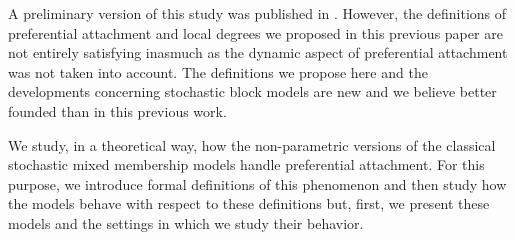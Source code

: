 
A preliminary version of this study was published in \cite{dulac-dsaa}. However, the definitions of preferential attachment and local degrees we proposed in this previous paper are not entirely satisfying inasmuch as the dynamic aspect of preferential attachment was not taken into account. The definitions we propose here and the developments concerning stochastic block models are new and we believe better founded than in this previous work.

We study, in a theoretical way, how the non-parametric versions of the classical stochastic mixed membership models handle preferential attachment. For this purpose, we introduce formal definitions of this phenomenon and then study how the models behave with respect  to these definitions but, first,  we present these models and the settings in which we study their behavior.

